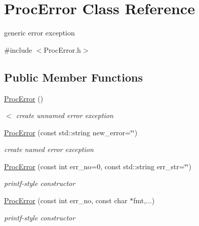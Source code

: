 \hypertarget{classProcError}{}\section{Proc\+Error Class Reference}
\label{classProcError}


generic error exception  




{\ttfamily \#include $<$Proc\+Error.\+h$>$}

\subsection*{Public Member Functions}
\begin{DoxyCompactItemize}
\item 
\hyperlink{classProcError_af2f56765e672178cba7f8105bd3347eb}{Proc\+Error} ()
\begin{DoxyCompactList}\small\item\em $<$ create unnamed error exception \end{DoxyCompactList}\item 
\mbox{\label{classProcError_ab9d1e4acf156799d955b080ea6e19fe0}} 
\hyperlink{classProcError_ab9d1e4acf156799d955b080ea6e19fe0}{Proc\+Error} (const std\+::string new\+\_\+error=\char`\"{}\char`\"{})
\begin{DoxyCompactList}\small\item\em create named error exception \end{DoxyCompactList}\item 
\mbox{\label{classProcError_af69e2425daf414e2ca77835e9849ba0f}} 
\hyperlink{classProcError_af69e2425daf414e2ca77835e9849ba0f}{Proc\+Error} (const int err\+\_\+no=0, const std\+::string err\+\_\+str=\char`\"{}\char`\"{})
\begin{DoxyCompactList}\small\item\em printf-\/style constructor \end{DoxyCompactList}\item 
\mbox{\label{classProcError_a8c58217001468841f21a73473836b931}} 
\hyperlink{classProcError_a8c58217001468841f21a73473836b931}{Proc\+Error} (const int err\+\_\+no, const char $\ast$fmt,...)
\begin{DoxyCompactList}\small\item\em printf-\/style constructor \end{DoxyCompactList}\item 

\end{DoxyCompactItemize}
